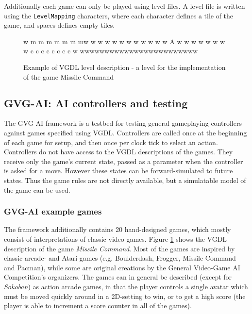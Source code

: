\documentclass[a4paper,titlepage,final, twoside]{report}
\begin{document}
Additionally each game can only be played using level files. 
A level file is written using the \texttt{LevelMapping} characters, where each character defines a tile of the game, and spaces defines empty tiles.

\begin{figure}[!ht]
\centering
\begin{vgdldesc}[linewidth=14cm]
w    m  m   m  m  m m mw
w                      w
w                      w
w                      w
w                      w
w                      w
w           A          w
w                      w
w                      w
w                      w
w   c c c c c c c c    w
wwwwwwwwwwwwwwwwwwwwwwww
\end{vgdldesc}
\caption{Example of VGDL level description - a level for the implementation of the game Missile Command}
\label{fig:vgdl}
\end{figure}



\subsection{GVG-AI: AI controllers and testing}
The GVG-AI framework is a testbed for testing general gameplaying controllers against games specified using VGDL. Controllers are called once at the beginning of each game for setup, and then once per clock tick to select an action. Controllers do not have access to the VGDL descriptions of the games. They receive only the game's current state, passed as a parameter when the controller is asked for a move. However these states can be forward-simulated to future states. Thus the game rules are not directly available, but a simulatable model of the game can be used.

\subsubsection*{GVG-AI example games}
The framework additionally contains 20 hand-designed games, which mostly consist of interpretations of classic video games. Figure \ref{fig:vgdl} shows the VGDL description of the game \emph{Missile Command}.
Most of the games are inspired by classic arcade- and Atari games (e.g. Boulderdash, Frogger, Missile Command and Pacman), while some are original creations by the General Video-Game AI Competition's organizers. 
The games can in general be described (except for \emph{Sokoban}) as action arcade games, in that the player controls a single avatar which must be moved quickly around in a 2D-setting to win, or to get a high score (the player is able to increment a score  counter in all of the games).
\end{document}
